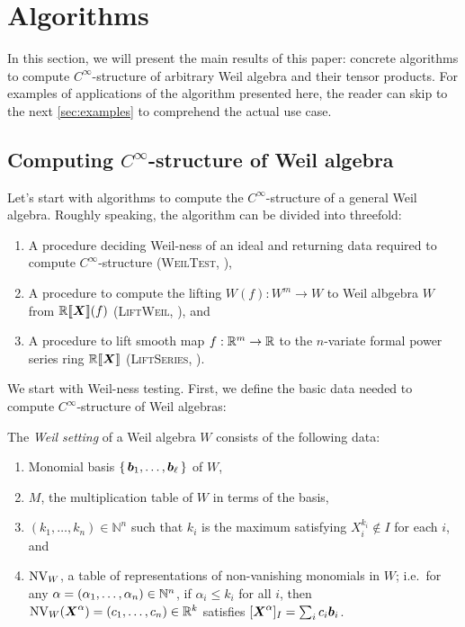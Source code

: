 \documentclass[%
  sigconf,authorversion,screen]{acmart}
\begin{document}
\section{Algorithms}\label{sec:alg}
In this section, we will present the main results of this paper: concrete algorithms to compute $C^\infty$-structure of arbitrary Weil algebra and their tensor products.
For examples of applications of the algorithm presented here, the reader can skip to the next \cref{sec:examples} to comprehend the actual use case.

\subsection{Computing $C^\infty$-structure of Weil algebra}
\label{sec:general-weil-algs}
Let's start with algorithms to compute the $C^\infty$-structure of a general Weil algebra.
Roughly speaking, the algorithm can be divided into threefold:

\begin{enumerate}
  \item A procedure deciding Weil-ness of an ideal and returning data required to compute $C^\infty$-structure (\textsc{WeilTest}, ),
  \item A procedure to compute the lifting  $W(f): W^m \to W$ to Weil albgebra $W$ from $\mathord{\mathbb{R}\llbracket\boldsymbol{X}\rrbracket}(f)$ (\textsc{LiftWeil}, ), and
  \item A procedure to lift smooth map $f: \mathbb{R}^m \to \mathbb{R}$ to the $n$-variate formal power series ring $\mathord{\mathbb{R}\llbracket\boldsymbol{X}\rrbracket}$ (\textsc{LiftSeries}, ).\label{step:lift-series}
\end{enumerate}

We start with Weil-ness testing.
First, we define the basic data needed to compute $C^\infty$-structure of Weil algebras:

\begin{definition}
  The \emph{Weil setting} of a Weil algebra $W$ consists of the following data:
  \begin{enumerate}[ref=(\arabic*)]
    \item Monomial basis $\set{\boldsymbol{b}_1, \dots, \boldsymbol{b}_\ell}$ of $W$,
    \item $M$, the multiplication table of $W$ in terms of the basis,
    \item $(k_1, \dots, k_n) \in \mathbb{N}^n$ such that $k_i$ is the maximum satisfying $X_i^{k_i} \notin I$ for each $i$, and
    \item $\operatorname{NV}_W$, a table of representations of non-vanishing monomials in $W$;
    i.e.\ for any $\alpha = (\alpha_1, \dots, \alpha_n) \in \mathbb{N}^n$, if $\alpha_i \leq k_i$ for all $i$, then $\operatorname{NV}_W(\boldsymbol{X}^\alpha) = (c_1, \dots, c_n) \in \mathbb{R}^k$ satisfies $[\boldsymbol{X}^\alpha]_I = \sum_i c_i \boldsymbol{b}_i$.\label{item:nonvan}
  \end{enumerate}
\end{definition}
\end{document}
